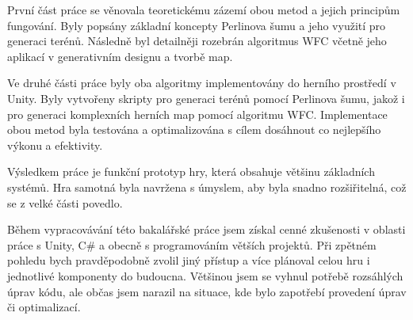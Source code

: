 První část práce se věnovala teoretickému zázemí obou metod a jejich principům fungování. Byly popsány základní koncepty Perlinova šumu a jeho využití pro generaci terénů. Následně byl detailněji rozebrán algoritmus WFC včetně jeho aplikací v generativním designu a tvorbě map.

Ve druhé části práce byly oba algoritmy implementovány do herního prostředí v Unity. Byly vytvořeny skripty pro generaci terénů pomocí Perlinova šumu, jakož i pro generaci komplexních herních map pomocí algoritmu WFC. Implementace obou metod byla testována a optimalizována s cílem dosáhnout co nejlepšího výkonu a efektivity.

Výsledkem práce je funkční prototyp hry, která obsahuje většinu základních systémů. Hra samotná byla navržena s úmyslem, aby byla snadno rozšiřitelná, což se z velké části povedlo.

Během vypracovávání této bakalářské práce jsem získal cenné zkušenosti v oblasti práce s Unity, C\# a obecně s programováním větších projektů. Při zpětném pohledu bych pravděpodobně zvolil jiný přístup a více plánoval celou hru i jednotlivé komponenty do budoucna. Většinou jsem se vyhnul potřebě rozsáhlých úprav kódu, ale občas jsem narazil na situace, kde bylo zapotřebí provedení úprav či optimalizací.